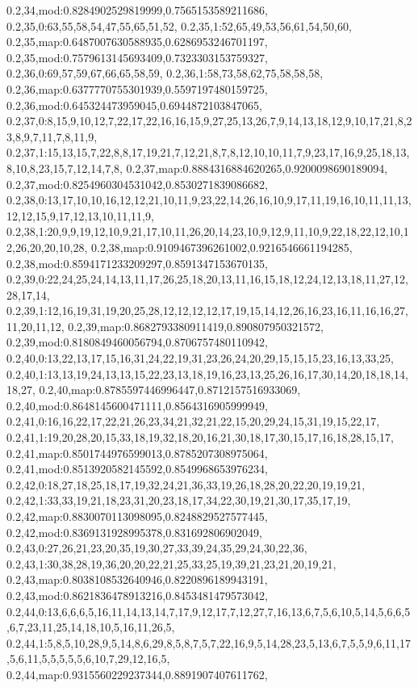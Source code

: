 0.2,34,mod:0.8284902529819999,0.7565153589211686,
0.2,35,0:63,55,58,54,47,55,65,51,52,
0.2,35,1:52,65,49,53,56,61,54,50,60,
0.2,35,map:0.6487007630588935,0.6286953246701197,
0.2,35,mod:0.7579613145693409,0.7323303153759327,
0.2,36,0:69,57,59,67,66,65,58,59,
0.2,36,1:58,73,58,62,75,58,58,58,
0.2,36,map:0.6377770755301939,0.5597197480159725,
0.2,36,mod:0.645324473959045,0.6944872103847065,
0.2,37,0:8,15,9,10,12,7,22,17,22,16,16,15,9,27,25,13,26,7,9,14,13,18,12,9,10,17,21,8,23,8,9,7,11,7,8,11,9,
0.2,37,1:15,13,15,7,22,8,8,17,19,21,7,12,21,8,7,8,12,10,10,11,7,9,23,17,16,9,25,18,13,8,10,8,23,15,7,12,14,7,8,
0.2,37,map:0.8884316884620265,0.9200098690189094,
0.2,37,mod:0.8254960304531042,0.8530271839086682,
0.2,38,0:13,17,10,10,16,12,12,21,10,11,9,23,22,14,26,16,10,9,17,11,19,16,10,11,11,13,12,12,15,9,17,12,13,10,11,11,9,
0.2,38,1:20,9,9,19,12,10,9,21,17,10,11,26,20,14,23,10,9,12,9,11,10,9,22,18,22,12,10,12,26,20,20,10,28,
0.2,38,map:0.9109467396261002,0.9216546661194285,
0.2,38,mod:0.8594171233209297,0.8591347153670135,
0.2,39,0:22,24,25,24,14,13,11,17,26,25,18,20,13,11,16,15,18,12,24,12,13,18,11,27,12,28,17,14,
0.2,39,1:12,16,19,31,19,20,25,28,12,12,12,12,17,19,15,14,12,26,16,23,16,11,16,16,27,11,20,11,12,
0.2,39,map:0.8682793380911419,0.890807950321572,
0.2,39,mod:0.8180849460056794,0.8706757480110942,
0.2,40,0:13,22,13,17,15,16,31,24,22,19,31,23,26,24,20,29,15,15,15,23,16,13,33,25,
0.2,40,1:13,13,19,24,13,13,15,22,23,13,18,19,16,23,13,25,26,16,17,30,14,20,18,18,14,18,27,
0.2,40,map:0.8785597446996447,0.8712157516933069,
0.2,40,mod:0.8648145600471111,0.8564316905999949,
0.2,41,0:16,16,22,17,22,21,26,23,34,21,32,21,22,15,20,29,24,15,31,19,15,22,17,
0.2,41,1:19,20,28,20,15,33,18,19,32,18,20,16,21,30,18,17,30,15,17,16,18,28,15,17,
0.2,41,map:0.8501744976599013,0.8785207308975064,
0.2,41,mod:0.8513920582145592,0.8549968653976234,
0.2,42,0:18,27,18,25,18,17,19,32,24,21,36,33,19,26,18,28,20,22,20,19,19,21,
0.2,42,1:33,33,19,21,18,23,31,20,23,18,17,34,22,30,19,21,30,17,35,17,19,
0.2,42,map:0.8830070113098095,0.8248829527577445,
0.2,42,mod:0.8369131928995378,0.831692806902049,
0.2,43,0:27,26,21,23,20,35,19,30,27,33,39,24,35,29,24,30,22,36,
0.2,43,1:30,38,28,19,36,20,20,22,21,25,33,25,19,39,21,23,21,20,19,21,
0.2,43,map:0.8038108532640946,0.8220896189943191,
0.2,43,mod:0.8621836478913216,0.8453481479573042,
0.2,44,0:13,6,6,6,5,16,11,14,13,14,7,17,9,12,17,7,12,27,7,16,13,6,7,5,6,10,5,14,5,6,6,5,6,7,23,11,25,14,18,10,5,16,11,26,5,
0.2,44,1:5,8,5,10,28,9,5,14,8,6,29,8,5,8,7,5,7,22,16,9,5,14,28,23,5,13,6,7,5,5,9,6,11,17,5,6,11,5,5,5,5,5,6,10,7,29,12,16,5,
0.2,44,map:0.9315560229237344,0.8891907407611762,
